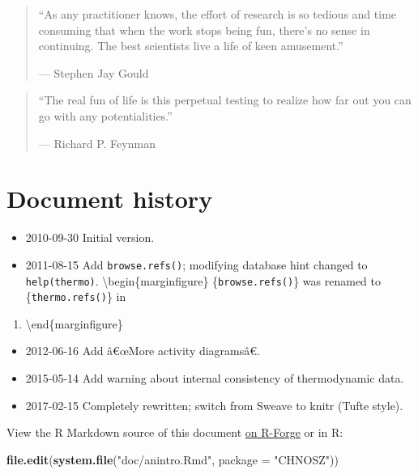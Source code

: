 \documentclass[]{tufte-handout}
\newcommand{\euro}{€}
\newenvironment{Shaded}{}{}
\newcommand{\KeywordTok}[1]{\textcolor[rgb]{0.00,0.44,0.13}{\textbf{#1}}}
\newcommand{\DataTypeTok}[1]{\textcolor[rgb]{0.56,0.13,0.00}{#1}}
\newcommand{\StringTok}[1]{\textcolor[rgb]{0.25,0.44,0.63}{#1}}
\newcommand{\NormalTok}[1]{#1}
\providecommand{\tightlist}{%
  \setlength{\itemsep}{0pt}\setlength{\parskip}{0pt}}
\begin{document}
\begin{quote}
``As any practitioner knows, the effort of research is so tedious and
time consuming that when the work stops being fun, there's no sense in
continuing. The best scientists live a life of keen amusement.''

\hfill --- Stephen Jay Gould
\end{quote}

\begin{quote}
``The real fun of life is this perpetual testing to realize how far out
you can go with any potentialities.''

\hfill --- Richard P. Feynman
\end{quote}

\section{Document history}\label{document-history}

\begin{itemize}
\tightlist
\item
  2010-09-30 Initial version.
\item
  2011-08-15 Add {\texttt{browse.refs()}}; modifying database hint
  changed to {\texttt{help(thermo)}}.
  \textbackslash{}begin\{marginfigure\} \{\texttt{browse.refs()}\} was
  renamed to \{\texttt{thermo.refs()}\} in
\end{itemize}

\begin{enumerate}
\def\labelenumi{\arabic{enumi}.}
\setcounter{enumi}{2016}
\tightlist
\item
  \textbackslash{}end\{marginfigure\}
\end{enumerate}

\begin{itemize}
\tightlist
\item
  2012-06-16 Add â\euro{}œMore activity diagramsâ\euro{}.
\item
  2015-05-14 Add warning about internal consistency of thermodynamic
  data.
\item
  2017-02-15 Completely rewritten; switch from Sweave to knitr (Tufte
  style).
\end{itemize}

View the R Markdown source of this document
\href{https://r-forge.r-project.org/scm/viewvc.php/pkg/CHNOSZ/vignettes/anintro.Rmd?view=markup\&root=chnosz}{on
R-Forge} or in R:

\begin{Shaded}
\begin{Highlighting}[]
\KeywordTok{file.edit}\NormalTok{(}\KeywordTok{system.file}\NormalTok{(}\StringTok{"doc/anintro.Rmd"}\NormalTok{, }\DataTypeTok{package =} \StringTok{"CHNOSZ"}\NormalTok{))}
\end{Highlighting}
\end{Shaded}
\end{document}
